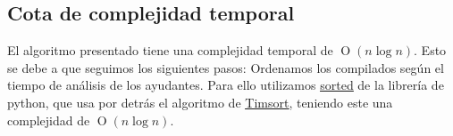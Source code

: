 \subsection{Cota de complejidad temporal}

El algoritmo presentado tiene una complejidad temporal de $\operatorname{O}(n \log{n})$. Esto se debe a 
que seguimos los siguientes pasos:
Ordenamos los compilados según el tiempo de análisis de los ayudantes. Para ello utilizamos
\href{https://docs.python.org/3/howto/sorting.html}{\color{cyan}\underline{sorted}} de la librería de python, que usa 
por detrás el algoritmo de
\href{https://en.wikipedia.org/wiki/Timsort}{\color{cyan}\underline{Timsort}}, teniendo este una complejidad de $\operatorname{O}(n \log{n})$.
